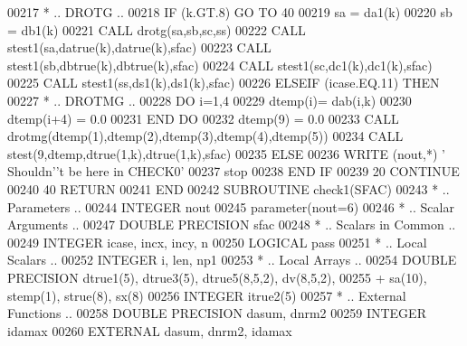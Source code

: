 \begin{DoxyCode}
00217 \textcolor{comment}{*           .. DROTG ..}
00218             \textcolor{keywordflow}{IF} (k.GT.8) \textcolor{keywordflow}{GO TO} 40
00219             sa = da1(k)
00220             sb = db1(k)
00221             \textcolor{keyword}{CALL }drotg(sa,sb,sc,ss)
00222             \textcolor{keyword}{CALL }stest1(sa,datrue(k),datrue(k),sfac)
00223             \textcolor{keyword}{CALL }stest1(sb,dbtrue(k),dbtrue(k),sfac)
00224             \textcolor{keyword}{CALL }stest1(sc,dc1(k),dc1(k),sfac)
00225             \textcolor{keyword}{CALL }stest1(ss,ds1(k),ds1(k),sfac)
00226          \textcolor{keywordflow}{ELSEIF} (icase.EQ.11) \textcolor{keywordflow}{THEN}
00227 \textcolor{comment}{*           .. DROTMG ..}
00228             \textcolor{keywordflow}{DO} i=1,4
00229                dtemp(i)= dab(i,k)
00230                dtemp(i+4) = 0.0
00231 \textcolor{keywordflow}{            END DO}
00232             dtemp(9) = 0.0
00233             \textcolor{keyword}{CALL }drotmg(dtemp(1),dtemp(2),dtemp(3),dtemp(4),dtemp(5))
00234             \textcolor{keyword}{CALL }stest(9,dtemp,dtrue(1,k),dtrue(1,k),sfac)
00235          \textcolor{keywordflow}{ELSE}
00236             \textcolor{keyword}{WRITE} (nout,*) \textcolor{stringliteral}{' Shouldn'}\textcolor{stringliteral}{'t be here in CHECK0'}
00237             stop
00238 \textcolor{keywordflow}{         END IF}
00239    20 \textcolor{keywordflow}{CONTINUE}
00240    40 \textcolor{keywordflow}{RETURN}
00241 \textcolor{keyword}{      END}
00242 \textcolor{keyword}{      SUBROUTINE }check1(SFAC)
00243 \textcolor{comment}{*     .. Parameters ..}
00244       \textcolor{keywordtype}{INTEGER}           nout
00245       parameter(nout=6)
00246 \textcolor{comment}{*     .. Scalar Arguments ..}
00247       \textcolor{keywordtype}{DOUBLE PRECISION}  sfac
00248 \textcolor{comment}{*     .. Scalars in Common ..}
00249       \textcolor{keywordtype}{INTEGER}           icase, incx, incy, n
00250       \textcolor{keywordtype}{LOGICAL}           pass
00251 \textcolor{comment}{*     .. Local Scalars ..}
00252       \textcolor{keywordtype}{INTEGER}           i, len, np1
00253 \textcolor{comment}{*     .. Local Arrays ..}
00254       \textcolor{keywordtype}{DOUBLE PRECISION}  dtrue1(5), dtrue3(5), dtrue5(8,5,2), dv(8,5,2),
00255      +                  sa(10), stemp(1), strue(8), sx(8)
00256       \textcolor{keywordtype}{INTEGER}           itrue2(5)
00257 \textcolor{comment}{*     .. External Functions ..}
00258       \textcolor{keywordtype}{DOUBLE PRECISION}  dasum, dnrm2
00259       \textcolor{keywordtype}{INTEGER}           idamax
00260       \textcolor{keywordtype}{EXTERNAL}          dasum, dnrm2, idamax

\end{DoxyCode}
